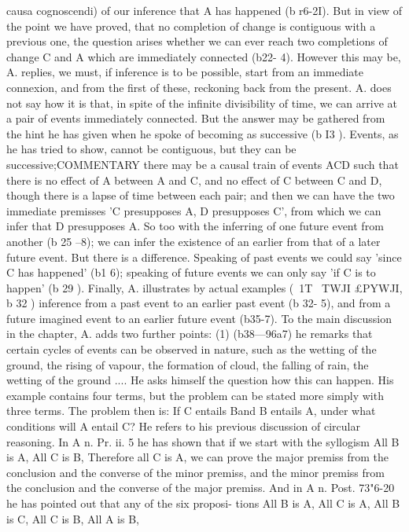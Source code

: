 {{{{{{{{{{{{{{{{{{{{{{{{{{{{{{{{{{{{{{{{{{{{{{{{{{{{{{{{{{{{{{causa cognoscendi) of our inference that A has happened (b r6-2I).
But in view of the point we have proved, that no completion of
change is contiguous with a previous one, the question arises
whether we can ever reach two completions of change C and A
which are immediately connected (b22- 4). However this may be,
A. replies, we must, if inference is to be possible, start from an
immediate connexion, and from the first of these, reckoning back
from the present.
A. does not say how it is that, in spite of the infinite divisibility
of time, we can arrive at a pair of events immediately connected.
But the answer may be gathered from the hint he has given
when he spoke of becoming as successive (b I3 ). Events, as he has
tried to show, cannot be contiguous, but they can be successive;COMMENTARY
there may be a causal train of events ACD such that there is no
effect of A between A and C, and no effect of C between C and
D, though there is a lapse of time between each pair; and then
we can have the two immediate premisses 'C presupposes A,
D presupposes C', from which we can infer that D presupposes A.
So too with the inferring of one future event from another
(b 25 --8); we can infer the existence of an earlier from that of a
later future event. But there is a difference. Speaking of past
events we could say 'since C has happened' (b1 6); speaking of
future events we can only say 'if C is to happen' (b 29 ).
Finally, A. illustrates by actual examples (~1T~ TWJI £PYWJI, b 32 )
inference from a past event to an earlier past event (b 32- 5), and
from a future imagined event to an earlier future event (b35-7).
To the main discussion in the chapter, A. adds two further
points: (1) (b38---96a7) he remarks that certain cycles of events
can be observed in nature, such as the wetting of the ground,
the rising of vapour, the formation of cloud, the falling of rain,
the wetting of the ground .... He asks himself the question how
this can happen. His example contains four terms, but the
problem can be stated more simply with three terms. The
problem then is: If C entails Band B entails A, under what
conditions will A entail C? He refers to his previous discussion
of circular reasoning. In A n. Pr. ii. 5 he has shown that if we
start with the syllogism All B is A, All C is B, Therefore all C
is A, we can prove the major premiss from the conclusion and
the converse of the minor premiss, and the minor premiss from
the conclusion and the converse of the major premiss. And in
A n. Post. 73"6-20 he has pointed out that any of the six proposi-
tions All B is A, All C is A, All B is C, All C is B, All A is B,
}}}}}}}}}}}}}}}}}}}}}}}}}}}}}}}}}}}}}}}}}}}}}}}}}}}}}}}}}}}}}}
